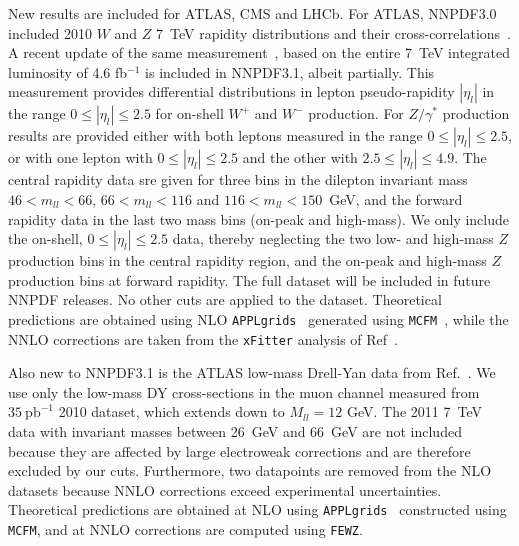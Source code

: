 New results are included for ATLAS, CMS and LHCb.
For ATLAS, NNPDF3.0 included 2010 $W$ and $Z$ 7~TeV rapidity distributions and their cross-correlations~\cite{Aad:2011dm}.
A recent update of the same measurement~\cite{Aaboud:2016btc}, based on the entire 7~TeV
integrated luminosity of 4.6 fb$^{-1}$ is included in NNPDF3.1, albeit
partially. 
This measurement provides differential distributions in lepton pseudo-rapidity $|\eta_l|$ in the range $0\le |\eta_l|\le 2.5$ for on-shell 
$W^+$ and $W^-$ production. For $Z/\gamma^*$  production results are
provided either with both leptons measured in the range $0\le
|\eta_l|\le 2.5$, or with one lepton with $0\le |\eta_l|\le 2.5$ and
the other with $2.5\le |\eta_l|\le 4.9$. The central rapidity data sre
given   
for three bins in the dilepton invariant mass $46<m_{ll}<66$,
$66<m_{ll}<116$ and $116<m_{ll}<150$~GeV, and the forward rapidity
data in the last two mass bins (on-peak and high-mass).
We only include the on-shell, $0\le |\eta_l|\le 2.5$ data, thereby
neglecting the two low- and high-mass $Z$ production bins in the
central rapidity region, and the on-peak and high-mass  $Z$ production bins at forward rapidity.
The 
full dataset will be included in future NNPDF releases. 
No other cuts are applied to the dataset.
Theoretical predictions are obtained using NLO {\tt APPLgrids}~\cite{Carli:2010rw} generated using {\tt MCFM}~\cite{MCFMurl}, 
while the NNLO corrections are taken from the {\tt xFitter} analysis of Ref~\cite{Aaboud:2016btc}.

Also new to NNPDF3.1 is the ATLAS low-mass Drell-Yan data from Ref.~\cite{Aad:2014qja}.
We use only the low-mass DY cross-sections in the muon channel measured from $35~\mathrm{pb}^{-1}$ 2010 dataset,
which extends down to $M_{ll}=12$ GeV.
%
The 2011 7~TeV data with invariant masses between 26~GeV and 66~GeV 
are not included because they are affected by large electroweak
corrections and are therefore excluded by our cuts. Furthermore, two
datapoints are removed from the NLO datasets because NNLO corrections
exceed experimental uncertainties.
Theoretical predictions are obtained at NLO using {\tt APPLgrids}~\cite{Carli:2010rw} constructed using
{\tt MCFM}, and at NNLO corrections are computed using {\tt FEWZ}.

